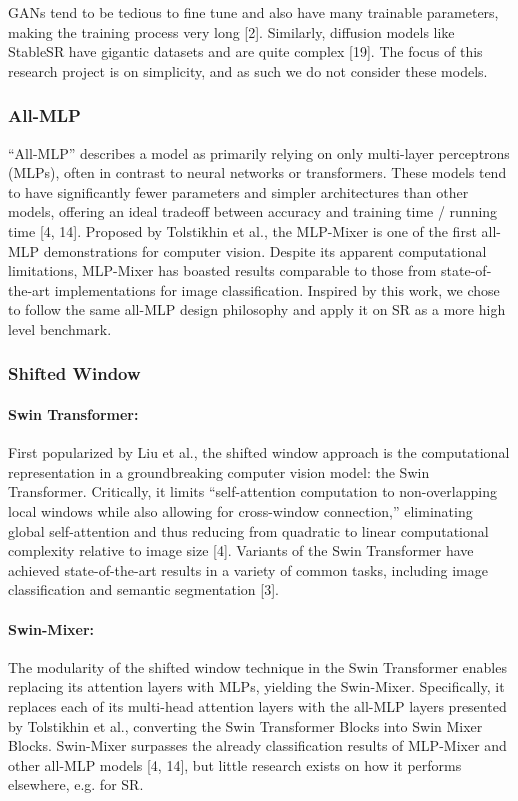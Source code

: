 \documentclass{article}
\begin{document}
GANs tend to be tedious to fine tune and also have many trainable parameters, making the training process very long [2]. Similarly, diffusion models like StableSR have gigantic datasets and are quite complex [19]. The focus of this research project is on simplicity, and as such we do not consider these models.


\subsubsection{All-MLP}

“All-MLP” describes a model as primarily relying on only multi-layer perceptrons (MLPs), often in contrast to neural networks or transformers. These models tend to have significantly fewer parameters and simpler architectures than other models, offering an ideal tradeoff between accuracy and training time / running time [4, 14]. Proposed by Tolstikhin et al., the MLP-Mixer is one of the first all-MLP demonstrations for computer vision. Despite its apparent computational limitations, MLP-Mixer has boasted results comparable to those from state-of-the-art implementations for image classification. Inspired by this work, we chose to follow the same all-MLP design philosophy and apply it on SR as a more high level benchmark.

\subsubsection{Shifted Window}

\paragraph{Swin Transformer:} First popularized by Liu et al., the shifted window approach is the computational representation in a groundbreaking computer vision model: the Swin Transformer. Critically, it limits “self-attention computation to non-overlapping local windows while also allowing for cross-window connection,” eliminating global self-attention and thus reducing from quadratic to linear computational complexity relative to image size [4]. Variants of the Swin Transformer have achieved state-of-the-art results in a variety of common tasks, including image classification and semantic segmentation [3].

\paragraph{Swin-Mixer:} The modularity of the shifted window technique in the Swin Transformer enables replacing its attention layers with MLPs, yielding the Swin-Mixer. Specifically, it replaces each of its multi-head attention layers with the all-MLP layers presented by Tolstikhin et al., converting the Swin Transformer Blocks into Swin Mixer Blocks. Swin-Mixer surpasses the already classification results of MLP-Mixer and other all-MLP models [4, 14], but little research exists on how it performs elsewhere, e.g. for SR.
\end{document}
